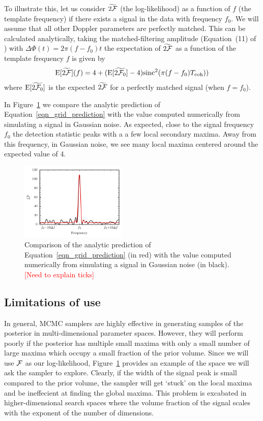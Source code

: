 \documentclass[aps, prd, twocolumn, superscriptaddress, floatfix, showpacs, nofootinbib, longbibliography]{revtex4-1}
\newcommand{\comment}[1]{\textcolor{red}{[#1]}}
\begin{document}
To illustrate this, let us consider $\widetilde{2{\mathcal{F}}}$ (the log-likelihood)
as a function of $f$ (the template frequency) if there exists a signal in the
data with frequency $f_0$. We will assume that all other Doppler parameters
are perfectly matched.
This can be calculated analytically, taking the matched-filtering amplitude
(Equation~(11) of \citep{prix2005}) with $\Delta\Phi(t) = 2\pi(f - f_0) t$
the expectation of $\widetilde{2{\mathcal{F}}}$ as a function of the template frequency
$f$ is given by
\begin{equation}
\textrm{E}[\widetilde{2{\mathcal{F}}}](f) = 4 + 
(\textrm{E}[\widetilde{2{\mathcal{F}}_0}] -4)\textrm{sinc}^{2}(\pi(f-f_0)T_{\rm coh}))
\label{eqn_grid_prediction}
\end{equation}
where $\textrm{E}[\widetilde{2{\mathcal{F}}_0}]$ is the expected $\widetilde{2{\mathcal{F}}}$ for
a perfectly matched signal (when $f=f_0$).

In Figure~\ref{fig_grid_frequency} we compare the analytic prediction of
Equation~\eqref{eqn_grid_prediction} with the value computed numerically
from simulating a signal in Gaussian noise. As expected, close to the signal
frequency $f_0$ the detection statistic peaks with a a few local secondary
maxima. Away from this frequency, in Gaussian noise, we see many local maxima
centered around the expected value of 4.
\begin{figure}[htb]
\centering \includegraphics[width=0.45\textwidth]{grided_frequency_search_1D}
\caption{Comparison of the analytic prediction of
Equation~\eqref{eqn_grid_prediction} (in red) with the value computed
numerically from simulating a signal in Gaussian noise (in black).
\comment{Need to explain ticks}}
\label{fig_grid_frequency}
\end{figure}

\subsection{Limitations of use}

In general, MCMC samplers are highly effective in generating samples of the
posterior in multi-dimensional parameter spaces. However, they will perform
poorly if the posterior has multiple small maxima with only a small number of
large maxima which occupy a small fraction of the prior volume. Since we will
use ${\mathcal{F}}$ as our log-likelihood, Figure~\ref{fig_grid_frequency} provides an
example of the space we will ask the sampler to explore. Clearly, if the width
of the signal peak is small compared to the prior volume, the sampler will get
`stuck' on the local maxima and be ineffecient at finding the global maxima.
This problem is excabated in higher-dimensional search spaces where the volume
fraction of the signal scales with the exponent of the number of dimensions.
\end{document}
